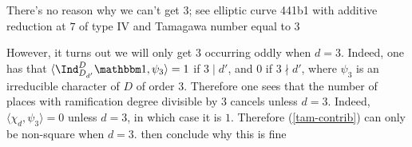 \begin{rem}
   There's no reason why we can't get 3; see elliptic curve 441b1 with additive reduction at $7$ of type IV and Tamagawa number equal to $3$
\end{rem}

However, it turns out we will only get $3$ occurring oddly when $d = 3$. Indeed, one has that $\langle \Ind_{D_{d'}}^D \trivial, \psi_3 \rangle = 1$ if $3 \mid d'$, and $0$ if $3 \nmid d'$, where $\psi_3$ is an irreducible character of $D$ of order $3$. Therefore one sees that the number of places with ramification degree divisible by $3$ cancels unless $d = 3$. Indeed, $\langle \chi_d , \psi_3 \rangle = 0$ unless $d = 3$, 
in which case it is $1$. Therefore (\ref{tam-contrib}) can only be non-square when $d = 3$. {\color{red} then conclude why this is fine}
